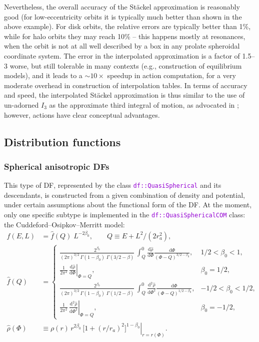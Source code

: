 \documentclass[12pt]{article}
\newcommand{\ttt}[1]{\textcolor{darkviolet}{\texttt{#1}}}
\renewcommand{\d}{\mathrm{d}}
\begin{document}
Nevertheless, the overall accuracy of the St\"ackel approximation is reasonably good (for low-eccentricity orbits it is typically much better than shown in the above example). For disk orbits, the relative errors are typically better than 1\%, while for halo orbits they may reach 10\% -- this happens mostly at resonances, when the orbit is not at all well described by a box in any prolate spheroidal coordinate system. The error in the interpolated approximation is a factor of 1.5--3 worse, but still tolerable in many contexts (e.g., construction of equilibrium models), and it leads to a $\sim 10\times$ speedup in action computation, for a very moderate overhead in construction of interpolation tables. In terms of accuracy and speed, the interpolated St\"ackel approximation is thus similar to the use of un-adorned $I_3$ as the approximate third integral of motion, as advocated in \cite{Bienayme2015}; however, actions have clear conceptual advantages.


\subsection{Distribution functions}  \label{sec:DFdetails}

\subsubsection{Spherical anisotropic DFs}  \label{sec:DFsphericalDetails}

This type of DF, represented by the class \ttt{df::QuasiSpherical} and its descendants, is constructed from a given combination of density and potential, under certain assumptions about the functional form of the DF. At the moment, only one specific subtype is implemented in the \ttt{df::QuasiSphericalCOM} class: the Cuddeford--Osipkov--Merritt model:
\begin{align}  \label{eq:DFanisotropic}
f(E,L) &= \hat f(Q) \; L^{-2\beta_0}, \qquad Q\equiv E + L^2 / (2 r_a^2) , \\[3mm]
\hat f(Q) &= \left\{  \begin{array}{ll}
\displaystyle \frac{2^{\beta_0}}{(2\pi)^{3/2}\, \Gamma(1-\beta_0)\; \Gamma(3/2-\beta)}\,
\int_Q^0 \frac{\d \hat\rho}{\d \Phi} \frac{\d \Phi}{(\Phi - Q)^{3/2-\beta_0}}, &
1/2<\beta_0<1, \\[7mm]
\displaystyle \frac{1}{2\pi^2}\, 
\left. \frac{\d \hat\rho}{\d \Phi} \right|_{\Phi=Q}, &
\beta_0=1/2, \\[7mm]
\displaystyle \frac{2^{\beta_0}}{(2\pi)^{3/2}\, \Gamma(1-\beta_0)\; \Gamma(1/2-\beta)}\,
\int_Q^0 \frac{\d ^2\hat\rho}{\d \Phi^2} \frac{\d \Phi}{(\Phi - Q)^{1/2-\beta_0}}, &
-1/2<\beta_0<1/2, \\[7mm]
\displaystyle \frac{1}{2\pi^2}\, 
\left. \frac{\d ^2\hat\rho}{\d \Phi^2} \right|_{\Phi=Q} , &
\beta_0=-1/2,
\end{array} \right. \nonumber \\[3mm]
\hat\rho(\Phi) &\equiv \left. \rho(r) \,r^{2\beta_0}\, \big[1 + (r/r_a)^2\big]^{1-\beta_0} \right|_{r=r(\Phi)}.  \nonumber
\end{align}
\end{document}
